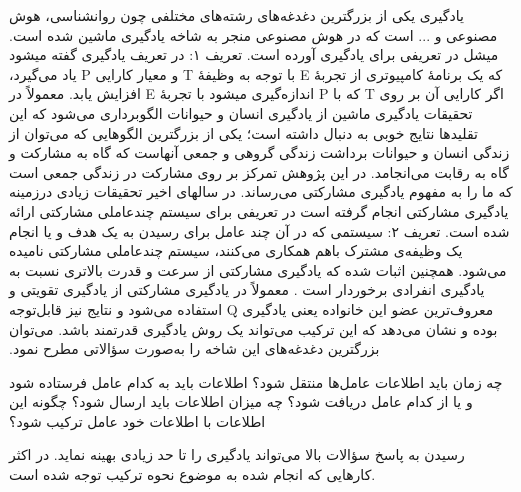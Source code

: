 \documentclass[12pt,a4paper]{article}
\begin{document}
یادگیری یکی از بزرگترین دغدغه‌های رشته‌های مختلفی چون روانشناسی، هوش مصنوعی و ... است که در هوش مصنوعی
منجر به شاخه یادگیری ماشین شده است. میشل در  تعریفی برای یادگیری آورده است.
تعریف ۱: در تعریف یادگیری گفته میشود که یک برنامهٔ کامپیوتری از تجربهٔ‫ E با توجه به وظیفهٔ T و معیار کارایی P یاد می‌گیرد، اگر کارایی ‫آن بر روی T که با P اندازه‌گیری میشود با تجربهٔ E افزایش یابد.
معمولاً در تحقیقات یادگیری ماشین از یادگیری انسان و حیوانات الگوبرداری می‌شود که این تقلیدها نتایج خوبی به دنبال
داشته است؛ یکی از بزرگترین الگوهایی که می‌توان از زندگی انسان و حیوانات برداشت زندگی گروهی و جمعی آنهاست که
گاه به مشارکت و گاه به رقابت می‌انجامد. در این پژوهش تمرکز بر روی مشارکت در زندگی جمعی است که ما را به مفهوم
یادگیری مشارکتی می‌رساند. در سالهای اخیر تحقیقات زیادی درزمینه یادگیری مشارکتی انجام گرفته است در  تعریفی برای
سیستم چندعاملی مشارکتی ارائه شده است.
تعریف ۲: سیستمی که در آن چند عامل برای رسیدن به یک هدف و یا انجام یک وظیفه‌ی مشترک باهم همکاری می‌کنند،
سیستم چندعاملی مشارکتی نامیده می‌شود.
همچنین اثبات شده که یادگیری مشارکتی از سرعت و قدرت بالاتری نسبت به یادگیری انفرادی برخوردار است . معمولاً در
یادگیری مشارکتی از یادگیری تقویتی و معروف‌ترین عضو این خانواده یعنی یادگیری Q استفاده می‌شود و نتایج نیز قابل‌توجه بوده
و نشان می‌دهد که این ترکیب می‌تواند یک روش یادگیری قدرتمند باشد. می‌توان بزرگترین دغدغه‌های این شاخه را به‌صورت
سؤالاتی مطرح نمود.
\begin{enumerate}\setlength\itemsep{-.5em}
 چه زمان باید اطلاعات عامل‌ها منتقل شود؟
 اطلاعات باید به کدام عامل فرستاده شود و یا از کدام عامل دریافت شود؟
 چه میزان اطلاعات باید ارسال شود؟
 چگونه این اطلاعات با اطلاعات خود عامل ترکیب شود؟
\end{enumerate}
رسیدن به پاسخ سؤالات بالا می‌تواند یادگیری را تا حد زیادی بهینه نماید. در اکثر کارهایی که انجام شده به موضوع نحوه
ترکیب توجه شده است.
\end{document}
